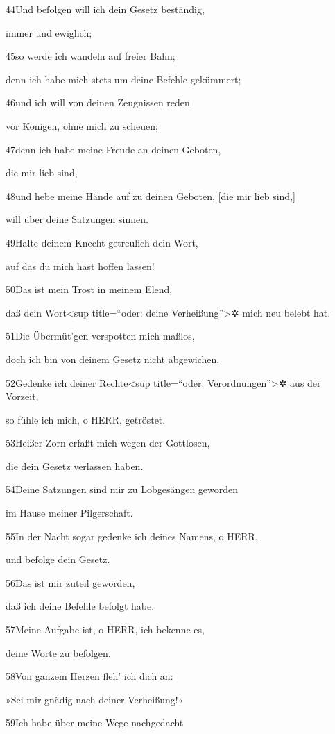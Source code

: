 44Und befolgen will ich dein Gesetz beständig,

immer und ewiglich;

45so werde ich wandeln auf freier Bahn;

denn ich habe mich stets um deine Befehle gekümmert;

46und ich will von deinen Zeugnissen reden

vor Königen, ohne mich zu scheuen;

47denn ich habe meine Freude an deinen Geboten,

die mir lieb sind,

48und hebe meine Hände auf zu deinen Geboten, {[}die mir lieb sind,{]}

will über deine Satzungen sinnen.

49Halte deinem Knecht getreulich dein Wort,

auf das du mich hast hoffen lassen!

50Das ist mein Trost in meinem Elend,

daß dein Wort\textless sup title=``oder: deine Verheißung''\textgreater✲
mich neu belebt hat.

51Die Übermüt'gen verspotten mich maßlos,

doch ich bin von deinem Gesetz nicht abgewichen.

52Gedenke ich deiner Rechte\textless sup title=``oder:
Verordnungen''\textgreater✲ aus der Vorzeit,

so fühle ich mich, o HERR, getröstet.

53Heißer Zorn erfaßt mich wegen der Gottlosen,

die dein Gesetz verlassen haben.

54Deine Satzungen sind mir zu Lobgesängen geworden

im Hause meiner Pilgerschaft.

55In der Nacht sogar gedenke ich deines Namens, o HERR,

und befolge dein Gesetz.

56Das ist mir zuteil geworden,

daß ich deine Befehle befolgt habe.

57Meine Aufgabe ist, o HERR, ich bekenne es,

deine Worte zu befolgen.

58Von ganzem Herzen fleh' ich dich an:

»Sei mir gnädig nach deiner Verheißung!«

59Ich habe über meine Wege nachgedacht

